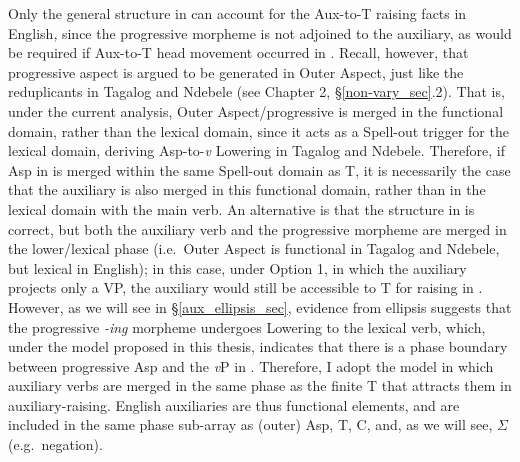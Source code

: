 \singlespacing
\begin{quote}
\begin{samepage}
\q{}

\begin{quote}
\qtreecentertrue
\end{quote}
\end{samepage}
\end{quote}
\onehalfspacing
Only the general structure in \Last[a] can account for the Aux-to-T raising facts in English, since the progressive morpheme is not adjoined to the auxiliary, as would be required if Aux-to-T head movement occurred in \Last[b]. Recall, however, that progressive aspect is argued to be generated in Outer Aspect, just like the reduplicants in Tagalog and Ndebele (see Chapter 2, \S\ref{non-vary_sec}.2). That is, under the current analysis, Outer Aspect/progressive is merged in the functional domain, rather than the lexical domain, since it acts as a Spell-out trigger for the lexical domain, deriving Asp-to-{\it v} Lowering in Tagalog and Ndebele. Therefore, if Asp in \Last[a] is merged within the same Spell-out domain as T, it is necessarily the case that the auxiliary is also merged in this functional domain, rather than in the lexical domain with the main verb. An alternative is that the structure in \Last[a] is correct, but both the auxiliary verb and the progressive morpheme are merged in the lower/lexical phase (i.e.\ Outer Aspect is functional in Tagalog and Ndebele, but lexical in English); in this case, under Option 1, in which the auxiliary projects only a VP, the auxiliary would still be accessible to T for raising in \Last[a]. However, as we will see in \S\ref{aux_ellipsis_sec}, evidence from ellipsis suggests that the progressive {\it -ing} morpheme undergoes Lowering to the lexical verb, which, under the model proposed in this thesis, indicates that there is a phase boundary between progressive Asp and the {\it v}P in \Last[a]. Therefore, I adopt the model in which auxiliary verbs are merged in the same phase as the finite T that attracts them in auxiliary-raising. English auxiliaries are thus functional elements, and are included in the same phase sub-array as (outer) Asp, T, C, and, as we will see, $\Sigma$ (e.g.\ negation).


